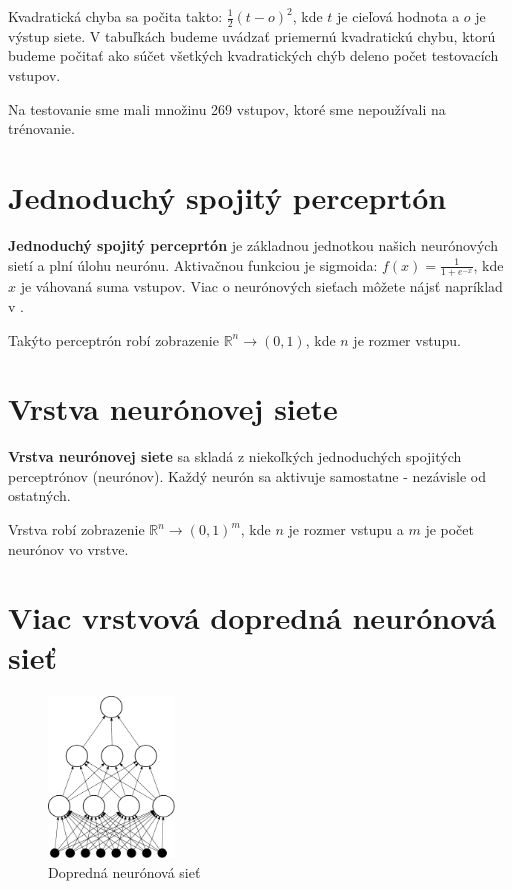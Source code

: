 Kvadratická chyba sa počita takto: $\frac{1}{2}(t-o)^2$, kde $t$ je cieľová hodnota a $o$ je výstup siete. V tabuľkách budeme uvádzať priemernú kvadratickú chybu, ktorú budeme počitať ako súčet všetkých kvadratických chýb deleno počet testovacích vstupov. 

Na testovanie sme mali množinu 269 vstupov, ktoré sme nepoužívali na trénovanie.

\section{Jednoduchý spojitý perceprtón}

\textbf{Jednoduchý spojitý perceprtón} je základnou jednotkou našich neurónových sietí a plní úlohu neurónu. Aktivačnou funkciou je sigmoida: $f(x) = \frac{1}{1+e^{-x}}$, kde $x$ je váhovaná suma vstupov. Viac o neurónových sieťach môžete nájsť napríklad v \cite{haykin1999neural}. 

Takýto perceptrón robí zobrazenie $\mathbb{R}^n\rightarrow (0,1)$, kde $n$ je rozmer vstupu.

\section{Vrstva neurónovej siete}

\textbf{Vrstva neurónovej siete} sa skladá z niekoľkých jednoduchých spojitých perceptrónov (neurónov). Každý neurón sa aktivuje samostatne - nezávisle od ostatných.

Vrstva robí zobrazenie $\mathbb{R}^n\rightarrow (0,1)^m$, kde $n$ je rozmer vstupu a $m$ je počet neurónov vo vrstve.

\section{Viac vrstvová dopredná neurónová sieť}

\begin{figure}[hp]
  \begin{center}
    \includegraphics[width=0.3\textwidth]{images/ffnn}
  \end{center}
  \caption{Dopredná neurónová sieť}
  \label{fig:ffnn}
\end{figure}

